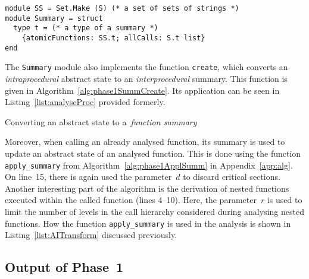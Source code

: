 \begin{lstlisting}[style=ocaml, label={list:phase1Summ}, float=hbt, caption={A~definition of the \emph{summary} in Phase~1}]
module SS = Set.Make (S) (* a set of sets of strings *)
module Summary = struct
  type t = (* a type of a summary *)
    {atomicFunctions: SS.t; allCalls: S.t list}
end
\end{lstlisting}

The \texttt{Summary} module also implements the function \texttt{create}, which converts an \emph{intraprocedural} abstract state to an \emph{interprocedural} summary. This function is given in Algorithm~\ref{alg:phase1SummCreate}. Its application can be seen in Listing~\ref{list:analyseProc} provided formerly.

\begin{algorithm}[hbt]
%
%
    \caption{Converting an abstract state to a~\emph{function summary}}
    \label{alg:phase1SummCreate}
\end{algorithm}

Moreover, when calling an already analysed function, its summary is used to update an abstract state of an analysed function. This is done using the function \texttt{apply\_summary} from Algorithm~\ref{alg:phase1ApplSumm} in Appendix~\ref{app:alg}. On line~15, there is again used the parameter~$ d $ to discard  critical sections. Another interesting part of the algorithm is the derivation of nested functions executed within the called function (lines 4--10). Here, the parameter~$ r $ is used to limit the number of levels in the call hierarchy considered during analysing nested functions. How the function \texttt{apply\_summary} is used in the analysis is shown in Listing~\ref{list:AITransform} discussed previously.

\subsection{Output of Phase~1}
\label{sec:phase1Output}

